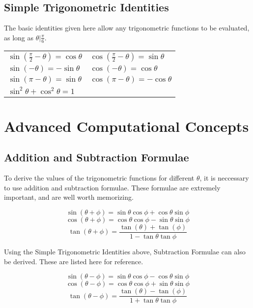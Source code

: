\documentclass[12pt, letterpaper]{article}
\begin{document}
\subsection{Simple Trigonometric Identities}

\par The basic identities given here allow any trigonometric functions to be evaluated, as long as $\theta | \frac{\pi}{6}$.

\begin{tabular}{ll}
$\sin{(\frac{\pi}{2}-\theta)} = \cos{\theta}$ & $\cos{(\frac{\pi}{2}-\theta)} = \sin{\theta}$ \\
$\sin{(-\theta)} = -\sin{\theta}$ & $\cos{(-\theta)} = \cos{\theta}$ \\
$\sin{(\pi-\theta)} = \sin{\theta}$ & $\cos{(\pi-\theta)} = -\cos{\theta}$ \\
$\sin^2{\theta} + \cos^2{\theta} = 1$ & \\
\end{tabular}

\section{Advanced Computational Concepts}

\subsection{Addition and Subtraction Formulae}

\par To derive the values of the trigonometric functions for different $\theta$, it is neccessary to use addition and subtraction formulae.  These formulae are extremely important, and are well worth memorizing.

\[
\sin{(\theta + \phi)} = \sin{\theta}\cos{\phi} + \cos{\theta}\sin{\phi}
\]
\[
\cos{(\theta + \phi)} = \cos{\theta}\cos{\phi} - \sin{\theta}\sin{\phi}
\]
\[
\tan{(\theta + \phi)} = \frac{\tan(\theta) + \tan(\phi)}{1-\tan{\theta}\tan{\phi}}
\]

\par Using the Simple Trigonometric Identities above, Subtraction Formulae can also be derived.  These are listed here for reference.

\[
\sin{(\theta - \phi)} = \sin{\theta}\cos{\phi} - \cos{\theta}\sin{\phi}
\]
\[
\cos{(\theta - \phi)} = \cos{\theta}\cos{\phi} + \sin{\theta}\sin{\phi}
\]
\[
\tan{(\theta - \phi)} = \frac{\tan(\theta) - \tan(\phi)}{1+\tan{\theta}\tan{\phi}}
\]
\end{document}
